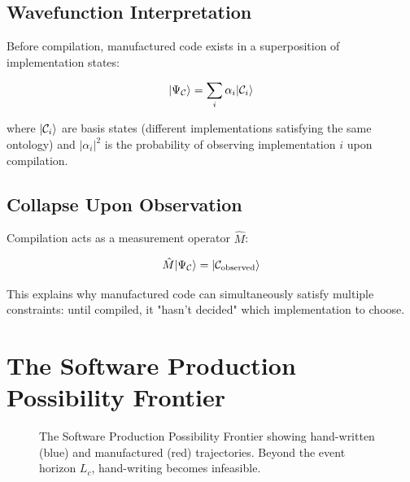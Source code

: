 \subsection{Wavefunction Interpretation}

Before compilation, manufactured code exists in a superposition of implementation states:

\begin{equation}
|\Psi_{\mathcal{C}}\rangle = \sum_{i} \alpha_i |\mathcal{C}_i\rangle
\end{equation}

where $|\mathcal{C}_i\rangle$ are basis states (different implementations satisfying the same ontology) and $|\alpha_i|^2$ is the probability of observing implementation $i$ upon compilation.

\subsection{Collapse Upon Observation}

Compilation acts as a measurement operator $\hat{M}$:

\begin{equation}
\hat{M} |\Psi_{\mathcal{C}}\rangle = |\mathcal{C}_{\text{observed}}\rangle
\end{equation}

This explains why manufactured code can simultaneously satisfy multiple constraints: until compiled, it "hasn't decided" which implementation to choose.

\section{The Software Production Possibility Frontier}

\begin{figure}[t]
\centering
{}
\caption{The Software Production Possibility Frontier showing hand-written (blue) and manufactured (red) trajectories. Beyond the event horizon $L_c$, hand-writing becomes infeasible.}
\label{fig:frontier}
\end{figure}
